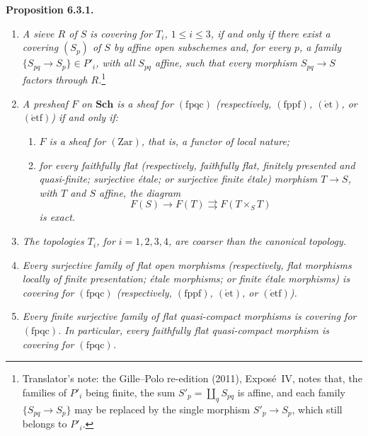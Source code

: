 \medskip
\noindent{}\textbf{Proposition 6.3.1.}
\begin{enumerate}
  \item[(i)] \textit{A sieve \(R\) of \(S\) is covering for \(T_i\),
    \(1\leq i\leq3\), if and only if there exist a covering
    \((S_p)\) of \(S\) by affine open subschemes and, for every \(p\), a
    family \(\{S_{pq}\to S_p\}\in P'_i\), with all \(S_{pq}\) affine,
    such that every morphism \(S_{pq}\to S\) factors through \(R\).}\footnote{Translator's note: the Gille--Polo re-edition (2011), Expos\'e~IV, notes
that, the families of \(P'_i\) being finite, the sum
\(S'_p=\coprod_qS_{pq}\) is affine, and each family
\(\{S_{pq}\to S_p\}\) may be replaced by the single morphism
\(S'_p\to S_p\), which still belongs to \(P'_i\).}

  \item[(ii)] \textit{A presheaf \(F\) on \(\mathbf{Sch}\) is a sheaf for
    \((\mathrm{fpqc})\) (respectively, \((\mathrm{fppf})\),
    \((\mathrm{\acute et})\), or \((\mathrm{\acute etf})\)) if and only
    if:}
    \begin{enumerate}
      \item[(a)] \textit{\(F\) is a sheaf for \((\mathrm{Zar})\), that is,
        a functor of local nature;}
      \item[(b)] \textit{for every faithfully flat (respectively,
        faithfully flat, finitely presented and quasi-finite; surjective
        \'{e}tale; or surjective finite \'{e}tale) morphism \(T\to S\),
        with \(T\) and \(S\) affine, the diagram}
        \[
          F(S)\longrightarrow F(T)\rightrightarrows F(T\times_ST)
        \]
        \textit{is exact.}
    \end{enumerate}

  \item[(iii)] \textit{The topologies \(T_i\), for \(i=1,2,3,4\), are
    coarser than the canonical topology.}

  \item[(iv)] \textit{Every surjective family of flat open morphisms
    (respectively, flat morphisms locally of finite presentation;
    \'{e}tale morphisms; or finite \'{e}tale morphisms) is covering for
    \((\mathrm{fpqc})\) (respectively, \((\mathrm{fppf})\),
    \((\mathrm{\acute et})\), or \((\mathrm{\acute etf})\)).}

  \item[(v)] \textit{Every finite surjective family of flat quasi-compact
    morphisms is covering for \((\mathrm{fpqc})\). In particular, every
    faithfully flat quasi-compact morphism is covering for
    \((\mathrm{fpqc})\).}
\end{enumerate}


